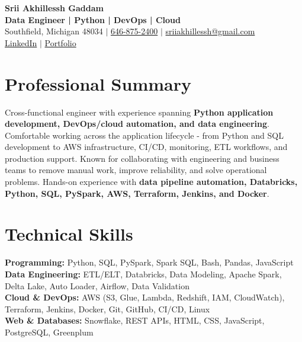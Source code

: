 \documentclass[letterpaper,10pt]{article}
\begin{document}
\fontsize{9.35pt}{10.45pt}\selectfont

\begin{center}
    {\LARGE \textbf{Srii Akhillessh Gaddam}} \\[-1pt]
    \textbf{Data Engineer | Python | DevOps | Cloud} \\[2pt]
    Southfield, Michigan 48034 $|$
    \href{tel:6468752400}{646-875-2400} $|$
    \href{mailto:sriiakhillessh@gmail.com}{sriiakhillessh@gmail.com} \\[1pt]
    \href{https://www.linkedin.com/in/srii-akhiilessh-gaddam-b48668191/}{LinkedIn} $|$
    \href{https://sriiakhillesshg.github.io/portfolio/}{Portfolio}
\end{center}
\vspace{-8pt}

\section{Professional Summary}
\small{Cross-functional engineer with experience spanning \textbf{Python application development, DevOps/cloud automation, and data engineering}. Comfortable working across the application lifecycle - from Python and SQL development to AWS infrastructure, CI/CD, monitoring, ETL workflows, and production support. Known for collaborating with engineering and business teams to remove manual work, improve reliability, and solve operational problems. Hands-on experience with \textbf{data pipeline automation, Databricks, Python, SQL, PySpark, AWS, Terraform, Jenkins, and Docker}.}

\section{Technical Skills}
\small{
\textbf{Programming:} Python, SQL, PySpark, Spark SQL, Bash, Pandas, JavaScript \\
\textbf{Data Engineering:} ETL/ELT, Databricks, Data Modeling, Apache Spark, Delta Lake, Auto Loader, Airflow, Data Validation \\
\textbf{Cloud \& DevOps:} AWS (S3, Glue, Lambda, Redshift, IAM, CloudWatch), Terraform, Jenkins, Docker, Git, GitHub, CI/CD, Linux \\
\textbf{Web \& Databases:} Snowflake, REST APIs, HTML, CSS, JavaScript, PostgreSQL, Greenplum
}

\end{document}
